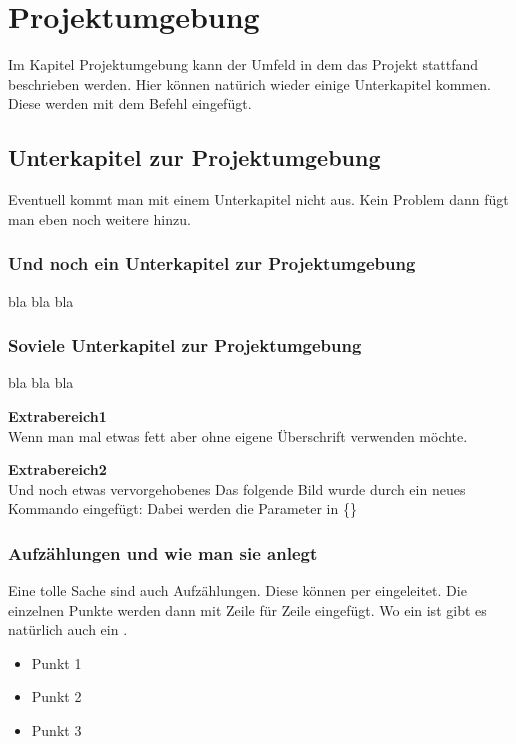 \newpage
\section{Projektumgebung}
Im Kapitel Projektumgebung kann der Umfeld in dem das Projekt stattfand beschrieben werden. 
Hier können natürich wieder einige Unterkapitel kommen. Diese werden mit dem Befehl 
 eingefügt.

\subsection{Unterkapitel zur Projektumgebung}
Eventuell kommt man mit einem Unterkapitel nicht aus. Kein Problem dann fügt man eben noch weitere hinzu.

\subsubsection{Und noch ein Unterkapitel zur Projektumgebung}
bla bla bla

\subsubsection{Soviele Unterkapitel zur Projektumgebung}
bla bla bla

\textbf{Extrabereich1}$\;$\\
Wenn man mal etwas fett aber ohne eigene Überschrift verwenden möchte.

\newpage
\textbf{Extrabereich2}$\;$\\
Und noch etwas vervorgehobenes
Das folgende Bild wurde durch ein neues Kommando eingefügt:
Dabei werden die Parameter in \{\}






\subsubsection{Aufzählungen und wie man sie anlegt}
Eine tolle Sache sind auch Aufzählungen. Diese können per  eingeleitet.
Die einzelnen Punkte werden dann mit  Zeile für Zeile eingefügt.
Wo ein  ist gibt es natürlich auch ein .
\begin{itemize}
\item Punkt 1
\item Punkt 2 
\item Punkt 3
\end{itemize}
